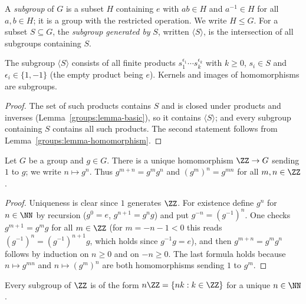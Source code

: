 \begin{definition}\label{groups:definition-subgroup}
A \emph{subgroup} of $G$ is a subset $H$ containing $e$ with $ab \in H$ and
$a^{-1} \in H$ for all $a, b \in H$; it is a group with the restricted operation.
We write $H \leq G$. For a subset $S \subseteq G$, the \emph{subgroup generated by}
$S$, written $\langle S \rangle$, is the intersection of all subgroups containing $S$.
\end{definition}

\begin{lemma}\label{groups:lemma-generated-subgroup}
The subgroup $\langle S \rangle$ consists of all finite products
$s_1^{\epsilon_1} \cdots s_k^{\epsilon_k}$ with $k \geq 0$, $s_i \in S$ and
$\epsilon_i \in \{1, -1\}$ (the empty product being $e$). Kernels and images of
homomorphisms are subgroups.
\end{lemma}

\begin{proof}
The set of such products contains $S$ and is closed under products and
inverses (Lemma~\ref{groups:lemma-basic}), so it contains $\langle S \rangle$; and
every subgroup containing $S$ contains all such products. The second statement
follows from Lemma~\ref{groups:lemma-homomorphism}.
\end{proof}

\begin{lemma}\label{groups:lemma-powers}
Let $G$ be a group and $g \in G$. There is a unique homomorphism
$\ZZ \to G$ sending $1$ to $g$; we write $n \mapsto g^n$. Thus
$g^{m+n} = g^m g^n$ and $(g^m)^n = g^{mn}$ for all $m, n \in \ZZ$.
\end{lemma}

\begin{proof}
Uniqueness is clear since $1$ generates $\ZZ$. For existence define $g^n$ for
$n \in \NN$ by recursion ($g^0 = e$, $g^{n+1} = g^n g$) and put
$g^{-n} = (g^{-1})^n$. One checks $g^{m+1} = g^m g$ for all $m \in \ZZ$ (for
$m = -n - 1 < 0$ this reads $(g^{-1})^{n} = (g^{-1})^{n+1} g$, which holds since
$g^{-1}g = e$), and then $g^{m+n} = g^m g^n$ follows by induction on $n \geq 0$ and
on $-n \geq 0$. The last formula holds because $n \mapsto g^{mn}$ and
$n \mapsto (g^m)^n$ are both homomorphisms sending $1$ to $g^m$.
\end{proof}

\begin{proposition}\label{groups:proposition-subgroups-integers}
Every subgroup of $\ZZ$ is of the form $n\ZZ = \{nk : k \in \ZZ\}$ for a unique
$n \in \NN$.
\end{proposition}

